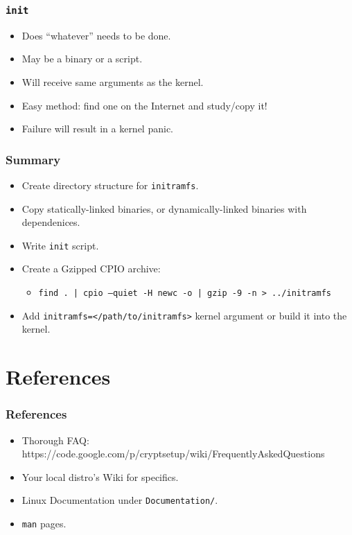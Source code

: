 \documentclass[xcolor={dvipsnames,svgnames},hyperref=dvips]{beamer}
\begin{document}
	\begin{frame}
		\frametitle{\texttt{init}}
		\begin{itemize}
		\item Does ``whatever'' needs to be done.
		\item May be a binary or a script.
		\item Will receive same arguments as the kernel.
		\item Easy method: find one on the Internet and study/copy it!
		\item Failure will result in a kernel panic.
		\end{itemize}
	\end{frame}

	\begin{frame}
		\frametitle{Summary}
		\begin{itemize}
		\item Create directory structure for \texttt{initramfs}.
		\item Copy statically-linked binaries, or dynamically-linked binaries with dependenices.
		\item Write \texttt{init} script.
		\item Create a Gzipped CPIO archive:
			\begin{itemize}
			\item \texttt{find . | cpio --quiet -H newc -o | gzip -9 -n > ../initramfs}
			\end{itemize}
		\item Add \texttt{initramfs=</path/to/initramfs>} kernel argument or build it into the kernel.
		\end{itemize}
	\end{frame}


\section{References}
\begin{frame}
	\frametitle{References}
	\begin{itemize}
	\item Thorough FAQ: https://code.google.com/p/cryptsetup/wiki/FrequentlyAskedQuestions
	\item Your local distro's Wiki for specifics.
	\item Linux Documentation under \texttt{Documentation/}.
	\item \texttt{man} pages.
	\end{itemize}
\end{frame}
\end{document}
